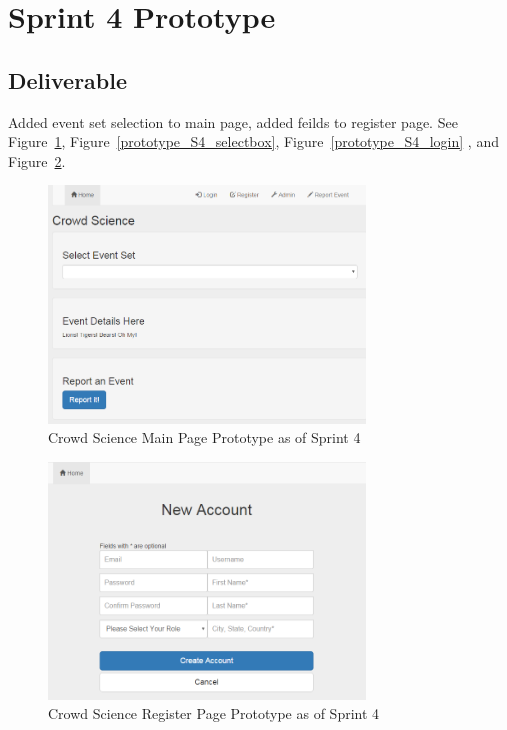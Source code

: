 \section{Sprint 4 Prototype}
\subsection{Deliverable}
Added event set selection to main page, added feilds to register page. See Figure~\ref{prototype_S4_main}, Figure~\ref{prototype_S4_selectbox}, Figure~\ref{prototype_S4_login} , and Figure~\ref{prototype_S4_register}.

\begin{figure}[tbh]
\begin{center}
\includegraphics[width=0.75\textwidth]{./figures/prototype_S4_main.png}
\end{center}
\caption{Crowd Science Main Page Prototype as of Sprint 4\label{prototype_S4_main}}
\end{figure}

\begin{figure}[tbh]
\begin{center}
\includegraphics[width=0.75\textwidth]{./figures/prototype_S4_register.png}
\end{center}
\caption{Crowd Science Register Page Prototype as of Sprint 4\label{prototype_S4_register}}
\end{figure}

